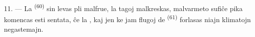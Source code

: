 11. --- La  \textsuperscript{(60)} sin levas pli malfrue, la tagoj
malkreskas, malvarmeto sufiĉe pika komencas esti sentata, ĉe la ,
kaj jen ke jam flugoj de  \textsuperscript{(61)} forlasas niajn
klimatojn negastemajn.
\VUsaut{6.0mm}
\VUfilet{22mm}
